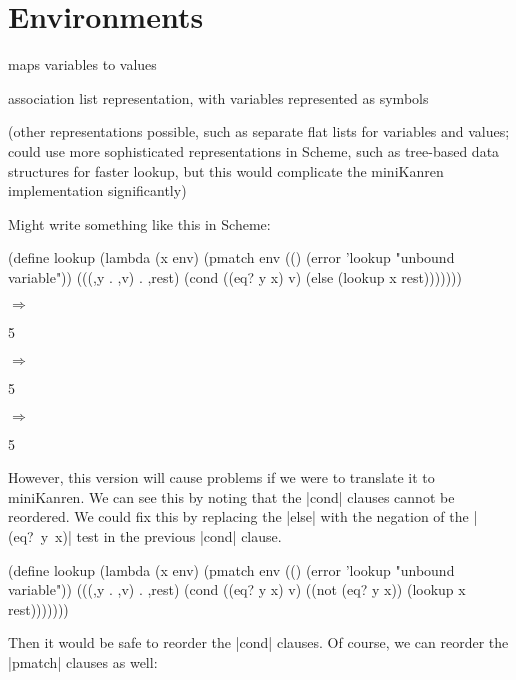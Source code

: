\chapter{Environments}

maps variables to values

association list representation, with variables represented as symbols

(other representations possible, such as separate flat lists for
variables and values; could use more sophisticated representations in
Scheme, such as tree-based data structures for faster lookup, but this
would complicate the miniKanren implementation significantly)

Might write something like this in Scheme:

\begin{schemedisplay}
(define lookup
  (lambda (x env)
    (pmatch env
      (() (error 'lookup "unbound variable"))
      (((,y . ,v) . ,rest)
       (cond
         ((eq? y x) v)
         (else (lookup x rest)))))))
\end{schemedisplay}


\noindent{} $\Rightarrow$
\begin{schemeresponsebox}5\end{schemeresponsebox}


\noindent{} $\Rightarrow$
\begin{schemeresponsebox}5\end{schemeresponsebox}


\noindent{} $\Rightarrow$
\begin{schemeresponsebox}5\end{schemeresponsebox}


However, this version will cause problems if we were to translate it
to miniKanren.  We can see this by noting that the \scheme|cond|
clauses cannot be reordered.  We could fix this by replacing the
\scheme|else| with the negation of the \mbox{\scheme|(eq? y x)|} test
in the previous \scheme|cond| clause.

\begin{schemedisplay}
(define lookup
  (lambda (x env)
    (pmatch env
      (() (error 'lookup "unbound variable"))
      (((,y . ,v) . ,rest)
       (cond
         ((eq? y x) v)
         ((not (eq? y x)) (lookup x rest)))))))
\end{schemedisplay}

Then it would be safe to reorder the \scheme|cond| clauses.  Of course, we can
reorder the \scheme|pmatch| clauses as well:

